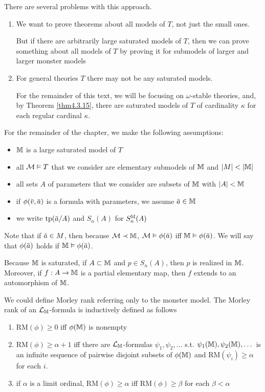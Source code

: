 \documentclass[11pt]{article}
\def \RM {\text{RM}}
\begin{document}
There are several problems with this approach.
\begin{enumerate}
\item We want to prove theorems about all models of \(T\), not just the small ones.

But if there are arbitrarily large saturated models of \(T\), then we can prove something
about all models of \(T\) by proving it for submodels of larger and larger monster models

\item For general theories \(T\) there may not be any saturated models.

 For the remainder of this text, we will be focusing on \(\omega\)-stable theories, and, by Theorem
 \ref{thm4.3.15}, there are saturated models of \(T\) of cardinality \(\kappa\) for each regular
cardinal \(\kappa\).
\end{enumerate}


For the remainder of the chapter, we make the following assumptions:
\begin{itemize}
\item \(\mathbb{M}\) is a large saturated model of \(T\)
\item all \(\mathcal{M}\vDash T\) that we consider are elementary submodels of \(\mathbb{M}\) and \(\abs{M}<\abs{\M}\)
\item all sets \(A\) of parameters that we consider are subsets of \(\mathbb{M}\) with \(\abs{A}<\M\)
\item if \(\phi(\barv,\bara)\) is a formula with parameters, we assume \(\bara\in\M\)
\item we write \(\tp(\bara/A)\) and \(S_n(A)\) for \(S_n^{\mathbb{M}}(A)\)
\end{itemize}


Note that if \(\bara\in M\), then because \(\mathcal{M}\prec\mathbb{M}\), \(\calm\vDash\phi(\bara)\) iff \(\M\vDash\phi(\bara)\). We will say
that \(\phi(\bara)\) holds if \(\M\vDash\phi(\bara)\).

Because \(\mathbb{M}\) is saturated, if \(A\subset\mathbb{M}\) and \(p\in S_n(A)\), then \(p\) is realized in \(\mathbb{M}\).
Moreover, if \(f:A\to\mathbb{M}\) is a partial elementary map, then \(f\) extends to an automorphism
of \(\mathbb{M}\).

We could define Morley rank referring only to the monster model. The Morley rank of
an \(\mathcal{L}_{\mathbb{M}}\)-formula is inductively defined as follows
\begin{enumerate}
\item \(\RM(\phi)\ge 0\) iff \(\phi(\mathbb{M})\) is nonempty
\item \(\RM(\phi)\ge\alpha+1\) iff there are \(\mathcal{L}_{\mathbb{M}}\)-formulas \(\psi_1,\psi_2,\dots\) s.t. \(\psi_1(\mathbb{M}),\psi_2(\mathbb{M}),\dots\) is an
infinite sequence of pairwise disjoint subsets of \(\phi(\mathbb{M})\) and \(\RM(\psi_i)\ge\alpha\) for each \(i\).
\item if \(\alpha\) is a limit ordinal, \(\RM(\phi)\ge\alpha\) iff \(\RM(\phi)\ge\beta\) for each \(\beta<\alpha\)
\end{enumerate}
\end{document}

